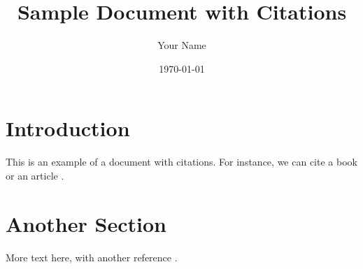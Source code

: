 \documentclass[11pt,a4paper]{article}
\title{Sample Document with Citations}
\author{Your Name}
\date{\today}
\begin{document}
\maketitle

\section{Introduction}
This is an example of a document with citations. For instance, we can cite a book \cite{Author1990} or an article \cite{Smith2019}.

\section{Another Section}
More text here, with another reference \cite{Johnson2021}.

\end{document}
